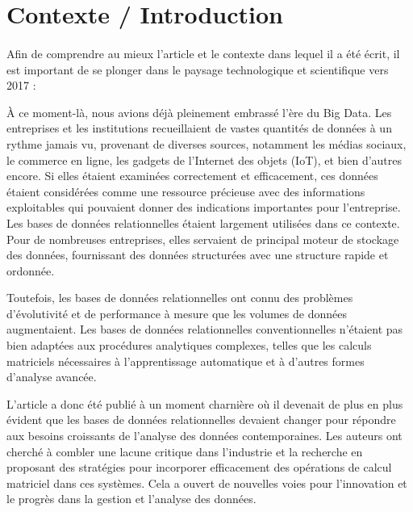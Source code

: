 \documentclass[a4paper, 12pt]{article}
\begin{document}
\newpage		
\tableofcontents %



\clearpage 

\section{Contexte / Introduction}

\paragraph{}
Afin de comprendre au mieux l’article et le contexte dans lequel il a été écrit,  il est important de se plonger dans le paysage technologique et scientifique vers 2017 : 

À ce moment-là, nous avions déjà pleinement embrassé l'ère du Big Data. Les entreprises et les institutions recueillaient de vastes quantités de données à un rythme jamais vu, provenant de diverses sources, notamment les médias sociaux, le commerce en ligne, les gadgets de l'Internet des objets (IoT), et bien d'autres encore. Si elles étaient examinées correctement et efficacement, ces données étaient considérées comme une ressource précieuse avec des informations exploitables qui pouvaient donner des indications importantes pour l'entreprise. Les bases de données relationnelles étaient largement utilisées dans ce contexte. Pour de nombreuses entreprises, elles servaient de principal moteur de stockage des données, fournissant des données structurées avec une structure rapide et ordonnée.

Toutefois, les bases de données relationnelles ont connu des problèmes d'évolutivité et de performance à mesure que les volumes de données augmentaient. Les bases de données relationnelles conventionnelles n'étaient pas bien adaptées aux procédures analytiques complexes, telles que les calculs matriciels nécessaires à l'apprentissage automatique et à d'autres formes d'analyse avancée.

L’article a donc été publié à un moment charnière où il devenait de plus en plus évident que les bases de données relationnelles devaient changer pour répondre aux besoins croissants de l'analyse des données contemporaines. Les auteurs ont cherché à combler une lacune critique dans l'industrie et la recherche en proposant des stratégies pour incorporer efficacement des opérations de calcul matriciel dans ces systèmes. Cela a ouvert de nouvelles voies pour l'innovation et le progrès dans la gestion et l'analyse des données.
\end{document}
